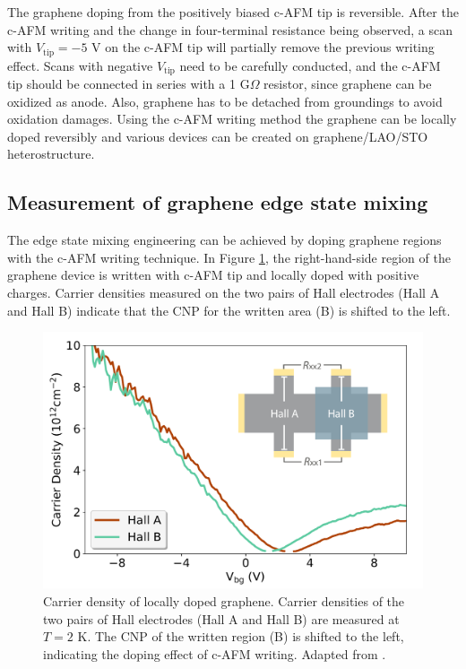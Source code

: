 \documentclass[pdflatex, sectionletters, 12pt, final, phd]{pittetd}    %
\begin{document}
The graphene doping from the positively biased c-AFM tip is reversible. After the c-AFM writing and the change in four-terminal resistance being observed, a scan with $V_\mathrm{tip}= -5$ V on the c-AFM tip will partially remove the previous writing effect. Scans with negative $V_\mathrm{tip}$ need to be carefully conducted, and the c-AFM tip should be connected in series with a 1 G$\Omega$ resistor, since graphene can be oxidized as anode\cite{alaboson2011conductive, byun2011nanoscale}. Also, graphene has to be detached from groundings to avoid oxidation damages\cite{alaboson2011conductive}. Using the c-AFM writing method the graphene can be locally doped reversibly and various devices can be created on graphene/LAO/STO heterostructure\cite{li2019reconfigurable, guo2018reconfigurable, li2019reversible, guo2019coulomb}. 

\subsection{Measurement of graphene edge state mixing}

The edge state mixing engineering can be achieved by doping graphene regions with the c-AFM writing technique. In Figure \ref{FIG:GrapheneDopedHall}, the right-hand-side region of the graphene device is written with c-AFM tip and locally doped with positive charges. Carrier densities measured on the two pairs of Hall electrodes (Hall A and Hall B) indicate that the CNP for the written area (B) is shifted to the left.

\begin{figure}[h!]
	\centering
	\includegraphics[width=.7\textwidth]{Drawing/GrapheneDopedHall.pdf}
	\caption[Carrier density of locally doped graphene]{Carrier density of locally doped graphene. Carrier densities of the two pairs of Hall electrodes (Hall A and Hall B) are measured at $T = 2$ K. The CNP of the written region (B) is shifted to the left, indicating the doping effect of c-AFM writing. Adapted from \cite{li2019reconfigurable}.}
	\label{FIG:GrapheneDopedHall}	
\end{figure}
\end{document}

